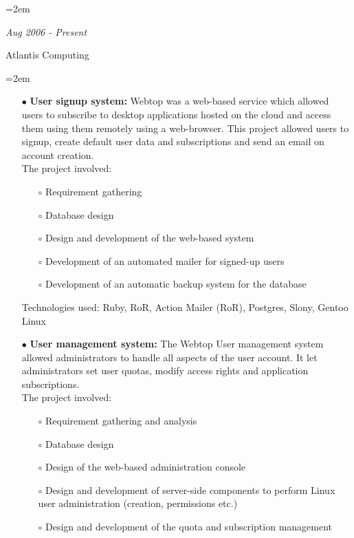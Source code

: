 \documentclass{scrartcl}
\newcommand{\MarginDate}[1]{\marginpar{\raggedleft\itshape\small#1}}
\newlength{\datebox}\settowidth{\datebox}{August 2006 - Present}
\newcommand{\NewWorkExperience}[3]{\noindent\hangindent=2em\hangafter=0 \parbox{\datebox}{\textit{#1}}\hspace{1.5em}
  #2 #3%
\vspace{0.5em}}
\newcommand{\Description}[1]{\hangindent=2em\hangafter=0\noindent\raggedright\footnotesize{#1}\par\normalsize}
\begin{document}
\begin{cv}{
\href{http://www.develmj.com}{}
}
\noindent{}
\vspace{0.5em}

\NewWorkExperience{\small{Aug 2006 - Present}}{\small{Atlantis
    Computing}}{}

\Description{
\begin{itemize}
\item[\footnotesize$\bullet$] \textbf{User signup system: }Webtop was a web-based service which \MarginDate{Atlantis Webtop}allowed users to
    subscribe to desktop applications hosted on the cloud and access them using
    them remotely using a web-browser. This project allowed users to signup,
    create default user data and subscriptions and send an email on account
    creation.\\
    The project involved:
    \begin{itemize}
    \item[\footnotesize$\circ$] Requirement gathering
    \item[\footnotesize$\circ$] Database design
    \item[\footnotesize$\circ$] Design and development of the
      web-based system
    \item[\footnotesize$\circ$] Development of an automated mailer for
      signed-up users
    \item[\footnotesize$\circ$] Development of an automatic backup
      system for the database
    \end{itemize}
    Technologies used: Ruby, RoR, Action Mailer (RoR), Postgres, Slony,
Gentoo Linux
  \item[\footnotesize$\bullet$] \textbf{User management system: }The Webtop User management system allowed
administrators to handle all aspects of the user account. It let administrators
set user quotas, modify access rights and application subscriptions.\\
The project involved:
    \begin{itemize}
    \item[\footnotesize$\circ$] Requirement gathering and analysis
    \item[\footnotesize$\circ$] Database design
    \item[\footnotesize$\circ$] Design of the web-based administration console
    \item[\footnotesize$\circ$] Design and development of server-side components to perform Linux
      user administration (creation, permissions etc.)
    \item[\footnotesize$\circ$] Design and development of the quota and subscription management

\end{itemize}
\end{itemize}}
\end{cv}
\end{document}
